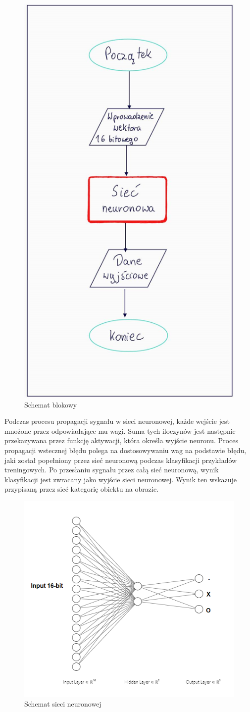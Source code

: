 \documentclass[a4paper, titleauthor]{mwart}
\begin{document}
\begin{figure}[h]
    \centering
    \includegraphics[width=1\linewidth, height=1\linewidth]{schemat_blokowy.png}
    \caption{Schemat blokowy}
\end{figure}
Podczas procesu propagacji sygnału w sieci neuronowej, każde wejście jest mnożone przez odpowiadające mu wagi. Suma tych iloczynów jest następnie przekazywana przez funkcję aktywacji, która określa wyjście neuronu. Proces propagacji wstecznej błędu polega na dostosowywaniu wag na podstawie błędu, jaki został popełniony przez sieć neuronową podczas klasyfikacji przykładów treningowych.
Po przesłaniu sygnału przez całą sieć neuronową, wynik klasyfikacji jest zwracany jako wyjście sieci neuronowej. Wynik ten wskazuje przypisaną przez sieć kategorię obiektu na obrazie.


\begin{figure}[h]
    \centering
    \includegraphics[width=1\linewidth, height=0.8\linewidth]{s1.png}
    \caption{Schemat sieci neuronowej}
\end{figure}
\end{document}
